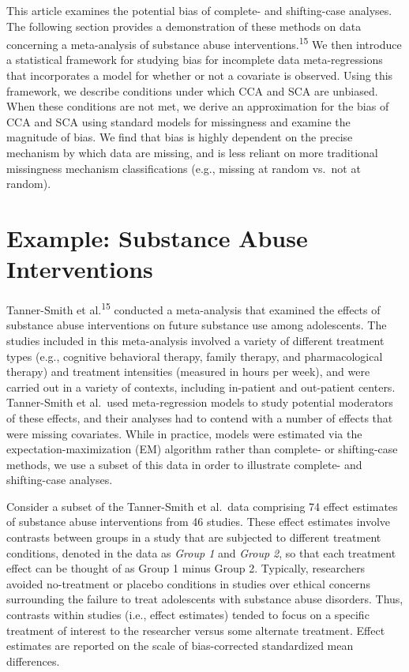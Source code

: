 \documentclass[
]{article}
\begin{document}
This article examines the potential bias of complete- and shifting-case analyses.
The following section provides a demonstration of these methods on data concerning a meta-analysis of substance abuse interventions.\textsuperscript{15}
We then introduce a statistical framework for studying bias for incomplete data meta-regressions that incorporates a model for whether or not a covariate is observed.
Using this framework, we describe conditions under which CCA and SCA are unbiased.
When these conditions are not met, we derive an approximation for the bias of CCA and SCA using standard models for missingness and examine the magnitude of bias.
We find that bias is highly dependent on the precise mechanism by which data are missing, and is less reliant on more traditional missingness mechanism classifications (e.g., missing at random vs.~not at random).

\hypertarget{example-substance-abuse-interventions}{%
\section{Example: Substance Abuse Interventions}\label{example-substance-abuse-interventions}}

Tanner-Smith et al.\textsuperscript{15} conducted a meta-analysis that examined the effects of substance abuse interventions on future substance use among adolescents.
The studies included in this meta-analysis involved a variety of different treatment types (e.g., cognitive behavioral therapy, family therapy, and pharmacological therapy) and treatment intensities (measured in hours per week), and were carried out in a variety of contexts, including in-patient and out-patient centers.
Tanner-Smith et al.~used meta-regression models to study potential moderators of these effects, and their analyses had to contend with a number of effects that were missing covariates.
While in practice, models were estimated via the expectation-maximization (EM) algorithm rather than complete- or shifting-case methods, we use a subset of this data in order to illustrate complete- and shifting-case analyses.

Consider a subset of the Tanner-Smith et al.~data comprising 74 effect estimates of substance abuse interventions from 46 studies.
These effect estimates involve contrasts between groups in a study that are subjected to different treatment conditions, denoted in the data as \emph{Group 1} and \emph{Group 2}, so that each treatment effect can be thought of as Group 1 minus Group 2.
Typically, researchers avoided no-treatment or placebo conditions in studies over ethical concerns surrounding the failure to treat adolescents with substance abuse disorders.
Thus, contrasts within studies (i.e., effect estimates) tended to focus on a specific treatment of interest to the researcher versus some alternate treatment.
Effect estimates are reported on the scale of bias-corrected standardized mean differences.
\end{document}
